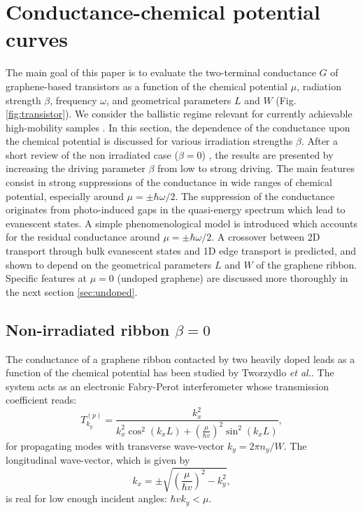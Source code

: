 \documentclass[aps,prb,showpacs,superscriptaddress,twocolumn,10pt,floatfix]{revtex4-1}
\begin{document}
\section{Conductance-chemical potential curves}

\label{sec:doped}
The main goal of this paper is to evaluate the two-terminal conductance $G$ of graphene-based transistors as a function of the chemical potential $\mu$, radiation strength $\beta$, frequency $\omega$, and geometrical parameters $L$ and $W$ (Fig. \ref{fig:transistor}). We consider the ballistic regime relevant for currently achievable high-mobility samples \cite{Calado2014,Banszerus2016,Wang2013One-Dimensional}. 
In this section, the dependence of the conductance upon the chemical potential is discussed for various irradiation strengths $\beta$. After a short review of the non irradiated case ($\beta=0$) \cite{Beenakker2006}, the results are presented by increasing the driving parameter $\beta$ from low to strong driving. The main features consist in strong suppressions of the conductance in wide ranges of chemical potential, especially around $\mu=\pm \hbar \omega/2$. The suppression of the conductance originates from photo-induced gaps in the quasi-energy spectrum which lead to evanescent states.  A simple phenomenological model is introduced which accounts for the residual conductance around  $\mu=\pm \hbar \omega/2$. A crossover between 2D transport through bulk evanescent states and 1D edge transport is predicted, and shown to depend on the geometrical parameters $L$ and $W$ of the graphene ribbon. Specific features at $\mu=0$ (undoped graphene) are discussed more thoroughly in the next section \ref{sec:undoped}. 



\subsection{Non-irradiated ribbon $\beta=0$}

\label{sec:non_irrad}

The conductance of a graphene ribbon contacted by two heavily doped leads as a function of the chemical potential has been studied by Tworzydlo {\it et al.}\cite{Beenakker2006}. The system acts as an electronic Fabry-Perot interferometer whose transmission coefficient reads:
\begin{equation}
T^{(p)}_{k_y}=\frac{k_x^2}{k_x^2\cos^2(k_xL)+\left(\frac{\mu}{\hbar v}\right)^2\sin^2(k_xL)},
\end{equation}
for propagating modes with transverse wave-vector $k_{y}=2\pi n_y/W$. The longitudinal wave-vector, which is given by
\begin{equation}
k_x=\pm\sqrt{\left(\frac{\mu}{\hbar v}\right)^2-k_y^2},
\end{equation}
is real for low enough incident angles: $\hbar vk_y < \mu$. 
\end{document}

